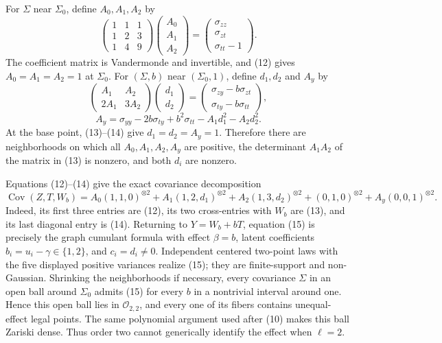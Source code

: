 For \(\Sigma\) near \(\Sigma_0\), define \(A_0,A_1,A_2\) by
\[
 \begin{pmatrix}
 1&1&1\\
 1&2&3\\
 1&4&9
 \end{pmatrix}
 \begin{pmatrix}A_0\\A_1\\A_2\end{pmatrix}
 =
 \begin{pmatrix}\sigma_{zz}\\\sigma_{zt}\\\sigma_{tt}-1\end{pmatrix}.
 \tag{12}
\]
The coefficient matrix is Vandermonde and invertible, and (12) gives \(A_0=A_1=A_2=1\) at \(\Sigma_0\).  For \((\Sigma,b)\) near \((\Sigma_0,1)\), define \(d_1,d_2\) and \(A_y\) by
\[
 \begin{pmatrix}A_1&A_2\\2A_1&3A_2\end{pmatrix}
 \begin{pmatrix}d_1\\d_2\end{pmatrix}
 =
 \begin{pmatrix}
 \sigma_{zy}-b\sigma_{zt}\\
 \sigma_{ty}-b\sigma_{tt}
 \end{pmatrix},
 \tag{13}
\]
\[
 A_y=\sigma_{yy}-2b\sigma_{ty}+b^2\sigma_{tt}
       -A_1d_1^2-A_2d_2^2.
 \tag{14}
\]
At the base point, (13)--(14) give \(d_1=d_2=A_y=1\).  Therefore there are neighborhoods on which all \(A_0,A_1,A_2,A_y\) are positive, the determinant \(A_1A_2\) of the matrix in (13) is nonzero, and both \(d_i\) are nonzero.

Equations (12)--(14) give the exact covariance decomposition
\[
 \operatorname{Cov}(Z,T,W_b)=
 A_0(1,1,0)^{\otimes2}
 +A_1(1,2,d_1)^{\otimes2}
 +A_2(1,3,d_2)^{\otimes2}
 +(0,1,0)^{\otimes2}
 +A_y(0,0,1)^{\otimes2}.
 \tag{15}
\]
Indeed, its first three entries are (12), its two cross-entries with \(W_b\) are (13), and its last diagonal entry is (14).  Returning to \(Y=W_b+bT\), equation (15) is precisely the graph cumulant formula with effect \(\beta=b\), latent coefficients \(b_i=u_i-\gamma\in\{1,2\}\), and \(c_i=d_i\ne0\).  Independent centered two-point laws with the five displayed positive variances realize (15); they are finite-support and non-Gaussian.  Shrinking the neighborhoods if necessary, every covariance \(\Sigma\) in an open ball around \(\Sigma_0\) admits (15) for every \(b\) in a nontrivial interval around one.  Hence this open ball lies in \(\mathcal O_{2,2}\), and every one of its fibers contains unequal-effect legal points.  The same polynomial argument used after (10) makes this ball Zariski dense.  Thus order two cannot generically identify the effect when \(\ell=2\).

